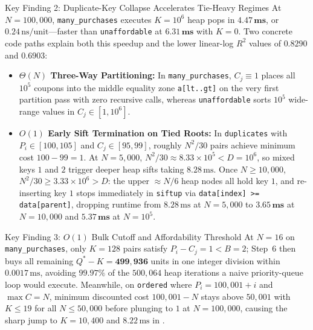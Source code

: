 \documentclass[10pt, a4paper]{article}
\newcommand{\code}[1]{\texttt{\color{primary!90!black}#1}}
\begin{document}
\begin{insightbox}{Key Finding 2: Duplicate-Key Collapse Accelerates Tie-Heavy Regimes}
At $N = 100{,}000$, \code{many\_purchases} executes $K = 10^6$ heap pops in $\mathbf{4.47\,\text{ms}}$, or $0.24\,\text{ns/unit}$---faster than \code{unaffordable} at $\mathbf{6.31\,\text{ms}}$ with $K = 0$. Two concrete code paths explain both this speedup and the lower linear-log $R^2$ values of $0.8290$ and $0.6903$:
\begin{itemize}
  \item \textbf{$\Theta(N)$ Three-Way Partitioning:} In \code{many\_purchases}, $C_j \equiv 1$ places all $10^5$ coupons into the middle equality zone \code{a[lt..gt]} on the very first partition pass with zero recursive calls, whereas \code{unaffordable} sorts $10^5$ wide-range values in $C_j \in [1, 10^6]$.
  \item \textbf{$O(1)$ Early Sift Termination on Tied Roots:} In \code{duplicates} with $P_i \in [100, 105]$ and $C_j \in [95, 99]$, roughly $N^2 / 30$ pairs achieve minimum cost $100 - 99 = 1$. At $N = 5{,}000$, $N^2/30 \approx 8.33 \times 10^5 < D = 10^6$, so mixed keys $1$ and $2$ trigger deeper heap sifts taking $8.28\,\text{ms}$. Once $N \ge 10{,}000$, $N^2/30 \ge 3.33 \times 10^6 > D$: the upper $\approx N/6$ heap nodes all hold key $1$, and re-inserting key $1$ stops immediately in \code{siftup} via \code{data[index] >= data[parent]}, dropping runtime from $8.28\,\text{ms}$ at $N = 5{,}000$ to $\mathbf{3.65\,\text{ms}}$ at $N = 10{,}000$ and $\mathbf{5.37\,\text{ms}}$ at $N = 10^5$.
\end{itemize}
\end{insightbox}
\vspace{-0.3em}

\begin{insightbox}{Key Finding 3: $O(1)$ Bulk Cutoff and Affordability Threshold}
At $N = 16$ on \code{many\_purchases}, only $K = 128$ pairs satisfy $P_i - C_j = 1 < B = 2$; Step~6 then buys all remaining $Q^* - K = \mathbf{499{,}936}$ units in one integer division within $0.0017\,\text{ms}$, avoiding $99.97\%$ of the $500{,}064$ heap iterations a naive priority-queue loop would execute. Meanwhile, on \code{ordered} where $P_i = 100{,}001 + i$ and $\max C = N$, minimum discounted cost $100{,}001 - N$ stays above $50{,}001$ with $K \le 19$ for all $N \le 50{,}000$ before plunging to $1$ at $N = 100{,}000$, causing the sharp jump to $K = 10{,}400$ and $8.22\,\text{ms}$ in .
\end{insightbox}
\end{document}
